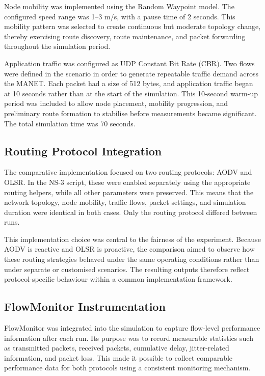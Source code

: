 \documentclass{Academic}
\begin{document}
Node mobility was implemented using the Random Waypoint model. The configured speed range was 1--3 m/s, with a pause time of 2 seconds. This mobility pattern was selected to create continuous but moderate topology change, thereby exercising route discovery, route maintenance, and packet forwarding throughout the simulation period.

Application traffic was configured as UDP Constant Bit Rate (CBR). Two flows were defined in the scenario in order to generate repeatable traffic demand across the MANET. Each packet had a size of 512 bytes, and application traffic began at 10 seconds rather than at the start of the simulation. This 10-second warm-up period was included to allow node placement, mobility progression, and preliminary route formation to stabilise before measurements became significant. The total simulation time was 70 seconds.

\subsection{Routing Protocol Integration}

The comparative implementation focused on two routing protocols: AODV and OLSR. In the NS-3 script, these were enabled separately using the appropriate routing helpers, while all other parameters were preserved. This means that the network topology, node mobility, traffic flows, packet settings, and simulation duration were identical in both cases. Only the routing protocol differed between runs.

This implementation choice was central to the fairness of the experiment. Because AODV is reactive and OLSR is proactive, the comparison aimed to observe how these routing strategies behaved under the same operating conditions rather than under separate or customised scenarios. The resulting outputs therefore reflect protocol-specific behaviour within a common implementation framework.

\subsection{FlowMonitor Instrumentation}

FlowMonitor was integrated into the simulation to capture flow-level performance information after each run. Its purpose was to record measurable statistics such as transmitted packets, received packets, cumulative delay, jitter-related information, and packet loss. This made it possible to collect comparable performance data for both protocols using a consistent monitoring mechanism.
\end{document}
